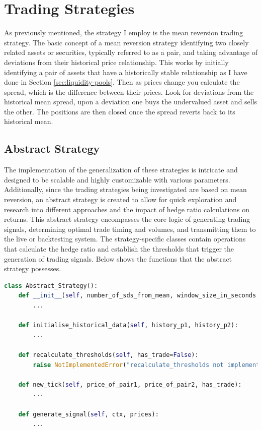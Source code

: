 \chapter{Trading Strategies}
\label{sec:strats}
As previously mentioned, the strategy I employ is the mean reversion trading strategy. The basic concept of a mean reversion strategy identifying two closely related assets or securities, typically referred to as a pair, and taking advantage of deviations from their historical price relationship. This works by initially identifying a pair of assets that have a historically stable relationship as I have done in Section \ref{sec:liquidity-pools}. Then as prices change you calculate the spread, which is the difference between their prices. Look for deviations from the historical mean spread, upon a deviation one buys the undervalued asset and sells the other. The positions are then closed once the spread reverts back to its historical mean.

\section{Abstract Strategy}
The implementation of the generalization of these strategies is intricate and designed to be scalable and highly customizable with various parameters. Additionally, since the trading strategies being investigated are based on mean reversion, an abstract strategy is created to allow for quick exploration and research into different approaches and the impact of hedge ratio calculations on returns. This abstract strategy encompasses the core logic of generating trading signals, determining optimal trade timing and volumes, and transmitting them to the live or backtesting system. The strategy-specific classes contain operations that calculate the hedge ratio and establish the thresholds that trigger the generation of trading signals. Below shows the functions that the abstract strategy possesses.
\vspace{5mm}
\begin{lstlisting}[language=Python]
class Abstract_Strategy():
    def __init__(self, number_of_sds_from_mean, window_size_in_seconds, percent_to_invest, strategy_name, gas_price_threshold, rebalance_threshold_as_percent_of_initial_investment):
        ...

    def initialise_historical_data(self, history_p1, history_p2):
        ...

    def recalculate_thresholds(self, has_trade=False):
        raise NotImplementedError("recalculate_thresholds not implemented")

    def new_tick(self, price_of_pair1, price_of_pair2, has_trade):
        ...

    def generate_signal(self, ctx, prices):
        ...

\end{lstlisting}
\vspace{5mm}

